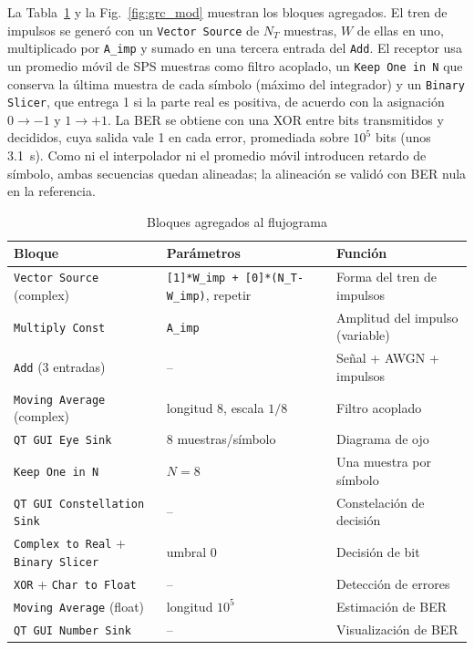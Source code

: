 La Tabla~\ref{tab:bloques} y la Fig.~\ref{fig:grc_mod} muestran los bloques
agregados. El tren de impulsos se generó con un \texttt{Vector Source} de
$N_T$ muestras, $W$ de ellas en uno, multiplicado por \texttt{A\_imp} y sumado
en una tercera entrada del \texttt{Add}. El receptor usa un promedio móvil de
SPS muestras como filtro acoplado, un \texttt{Keep One in N} que conserva la
última muestra de cada símbolo (máximo del integrador) y un
\texttt{Binary Slicer}, que entrega 1 si la parte real es positiva, de acuerdo
con la asignación $0\to-1$ y $1\to+1$. La BER se obtiene con una XOR entre bits
transmitidos y decididos, cuya salida vale 1 en cada error, promediada sobre
$10^5$ bits (unos \SI{3,1}{\second}). Como ni el interpolador ni el promedio
móvil introducen retardo de símbolo, ambas secuencias quedan alineadas; la
alineación se validó con BER nula en la referencia.

\begin{table}[!t]
\centering
\caption{Bloques agregados al flujograma}
\label{tab:bloques}
\scriptsize
\setlength{\tabcolsep}{3pt}
\begin{tabular}{@{}p{}p{}p{}@{}}
\toprule
\textbf{Bloque} & \textbf{Parámetros} & \textbf{Función} \\
\midrule
\texttt{Vector Source} (complex) & \texttt{[1]*W\_imp + [0]*(N\_T-W\_imp)}, repetir & Forma del tren de impulsos \\
\texttt{Multiply Const} & \texttt{A\_imp} & Amplitud del impulso (variable) \\
\texttt{Add} (3 entradas) & -- & Señal + AWGN + impulsos \\
\texttt{Moving Average} (complex) & longitud 8, escala $1/8$ & Filtro acoplado \\
\texttt{QT GUI Eye Sink} & 8 muestras/símbolo & Diagrama de ojo \\
\texttt{Keep One in N} & $N=8$ & Una muestra por símbolo \\
\texttt{QT GUI Constellation Sink} & -- & Constelación de decisión \\
\texttt{Complex to Real} + \texttt{Binary Slicer} & umbral 0 & Decisión de bit \\
\texttt{XOR} + \texttt{Char to Float} & -- & Detección de errores \\
\texttt{Moving Average} (float) & longitud $10^5$ & Estimación de BER \\
\texttt{QT GUI Number Sink} & -- & Visualización de BER \\
\bottomrule
\end{tabular}
\end{table}

